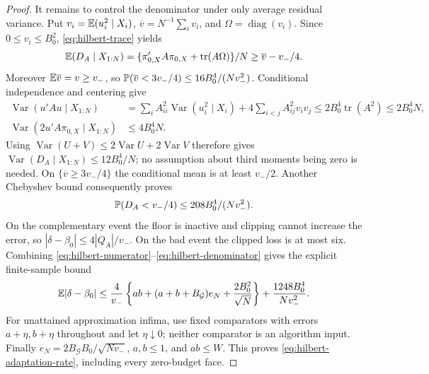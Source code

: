 \begin{proof}
It remains to control the denominator under only average residual
variance.  Put $v_i=\mathbb E(u_i^2\mid X_i)$,
$\overline v=N^{-1}\sum_i v_i$, and $\Omega=\operatorname{diag}(v_i)$.
Since $0\le v_i\le B_0^2$, \eqref{eq:hilbert-trace} yields
\[
 \mathbb E(D_A\mid X_{1:N})
 =\{\pi_{0,X}'A\pi_{0,X}+\operatorname{tr}(A\Omega)\}/N
 \ge\overline v-v_-/4.
\]
Moreover $\mathbb E\overline v=v\ge v_-$, so
$\mathbb P(\overline v<3v_-/4)\le16B_0^4/(Nv_-^2)$.
Conditional independence and centering give
\[
 \begin{aligned}
 \operatorname{Var}(u'Au\mid X_{1:N})
 &=\sum_i A_{ii}^2\operatorname{Var}(u_i^2\mid X_i)
   +4\sum_{i<j}A_{ij}^2v_iv_j
 \le2B_0^4\operatorname{tr}(A^2)\le2B_0^4N,\\
 \operatorname{Var}(2u'A\pi_{0,X}\mid X_{1:N})
 &\le4B_0^4N.
 \end{aligned}
\]
Using $\operatorname{Var}(U+V)\le2\operatorname{Var}U+2\operatorname{Var}V$
therefore gives $\operatorname{Var}(D_A\mid X_{1:N})\le12B_0^4/N$;
no assumption about third moments being zero is needed.  On
$\{\overline v\ge3v_-/4\}$ the conditional mean is at least $v_-/2$.
Another Chebyshev bound consequently proves
\begin{equation}
 \mathbb P(D_A<v_-/4)\le208B_0^4/(Nv_-^2).
 \label{eq:hilbert-denominator}
\end{equation}
On the complementary event the floor is inactive and clipping cannot
increase the error, so $|\delta-\beta_0|\le4|Q_A|/v_-$.
On the bad event the clipped loss is at most six.  Combining
\eqref{eq:hilbert-numerator}--\eqref{eq:hilbert-denominator} gives the
explicit finite-sample bound
\begin{equation}
 \mathbb E|\delta-\beta_0|
 \le\frac4{v_-}
 \left\{ab+(a+b+B_{\mathcal G})e_N+\frac{2B_0^2}{\sqrt N}\right\}
 +\frac{1248B_0^4}{Nv_-^2}.
 \label{eq:hilbert-explicit-risk}
\end{equation}
For unattained approximation infima, use fixed comparators with errors
$a+\eta,b+\eta$ throughout and let $\eta\downarrow0$; neither comparator
is an algorithm input.  Finally $e_N=2B_{\mathcal G}B_0/\sqrt{Nv_-}$,
$a,b\le1$, and $ab\le W$.  This proves
\eqref{eq:hilbert-adaptation-rate}, including every zero-budget face.
\end{proof}

